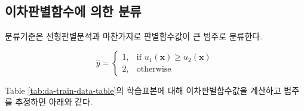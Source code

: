 \documentclass[]{book}
\newenvironment{Shaded}{\begin{snugshade}}{\end{snugshade}}
\newcommand{\ControlFlowTok}[1]{\textcolor[rgb]{0.13,0.29,0.53}{\textbf{#1}}}
\newcommand{\DecValTok}[1]{\textcolor[rgb]{0.00,0.00,0.81}{#1}}
\newcommand{\FloatTok}[1]{\textcolor[rgb]{0.00,0.00,0.81}{#1}}
\newcommand{\KeywordTok}[1]{\textcolor[rgb]{0.13,0.29,0.53}{\textbf{#1}}}
\newcommand{\NormalTok}[1]{#1}
\newcommand{\OperatorTok}[1]{\textcolor[rgb]{0.81,0.36,0.00}{\textbf{#1}}}
\newcommand{\StringTok}[1]{\textcolor[rgb]{0.31,0.60,0.02}{#1}}
\begin{document}
\begin{Shaded}
\end{Shaded}

\hypertarget{qda-discriminant-rule}{%
\subsection{이차판별함수에 의한 분류}\label{qda-discriminant-rule}}

분류기준은 선형판별분석과 마찬가지로 판별함수값이 큰 범주로 분류한다.

\begin{equation*}
\hat{y} = \begin{cases}
    1, & \text{if } u_1(\mathbf{x}) \ge u_2(\mathbf{x})  \\
    2, & \text{otherwise}
\end{cases}
\end{equation*}

Table \ref{tab:da-train-data-table}의 학습표본에 대해 이차판별함수값을 계산하고 범주를 추정하면 아래와 같다.
\end{document}
